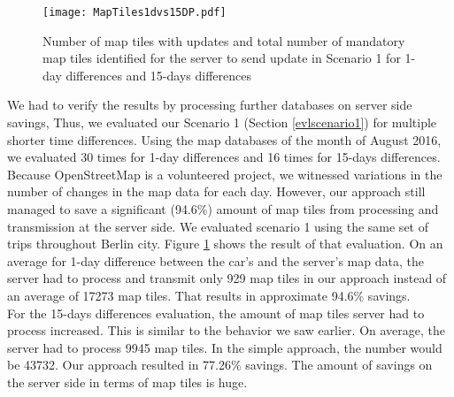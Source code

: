 \begin{figure}
\centering
\texttt{[image: MapTiles1dvs15DP.pdf]}
\caption{Number of map tiles with updates and total number of mandatory map tiles identified for the server to send update in Scenario 1 for 1-day differences and 15-days differences}
\label{fg:scenario11dv15d}
\end{figure}



We had to verify the results by processing further databases on server side savings, Thus, we evaluated our Scenario 1 (Section \ref{evlscenario1}) for multiple shorter time differences. Using the map databases of the month of August 2016, we evaluated 30 times for 1-day differences and 16 times for 15-days differences. Because OpenStreetMap is a volunteered project, we witnessed variations in the number of changes in the map data for each day. However, our approach still managed to save a significant (94.6\%) amount of map tiles from processing and transmission at the server side. We evaluated scenario 1 using the same set of trips throughout Berlin city. Figure \ref{fg:scenario11dv15d} shows the result of that evaluation. On an average for 1-day difference between the car's and the server's map data, the server had to process and transmit only 929 map tiles in our approach instead of an average of 17273 map tiles. That results in approximate 94.6\% savings. \\

For the 15-days differences evaluation, the amount of map tiles server had to process increased. This is similar to the behavior we saw earlier. On average, the server had to process 9945 map tiles. In the simple approach, the number would be 43732. Our approach resulted in 77.26\% savings. The amount of savings on the server side in terms of map tiles is huge. \\





